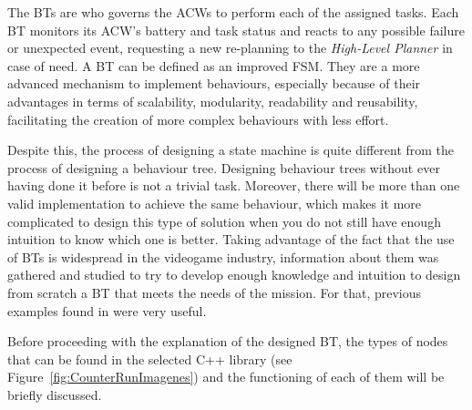 The \glspl{BT} are who governs the \glspl{ACW} to perform each of the assigned tasks. Each \gls{BT} monitors its \gls{ACW}'s battery and task status and reacts to any possible failure or unexpected event, requesting a new re-planning to the \emph{High-Level Planner} in case of need. A \gls{BT} can be defined as an improved \gls{FSM}. They are a more advanced mechanism to implement behaviours, especially because of their advantages in terms of scalability, modularity, readability and reusability, facilitating the creation of more complex behaviours with less effort.

Despite this, the process of designing a state machine is quite different from the process of designing a behaviour tree. Designing behaviour trees without ever having done it before is not a trivial task. Moreover, there will be more than one valid implementation to achieve the same behaviour, which makes it more complicated to design this type of solution when you do not still have enough intuition to know which one is better. Taking advantage of the fact that the use of \glspl{BT} is widespread in the videogame industry, information about them was gathered and studied to try to develop enough knowledge and intuition to design from scratch a \gls{BT} that meets the needs of the mission. For that, previous examples found in \cite{BT-CPP-doc, colledanchise2018behavior, BT-AI} were very useful.

Before proceeding with the explanation of the designed \gls{BT}, the types of nodes that can be found in the selected C++ library (see Figure~\ref{fig:CounterRunImagenes}) and the functioning of each of them will be briefly discussed.

